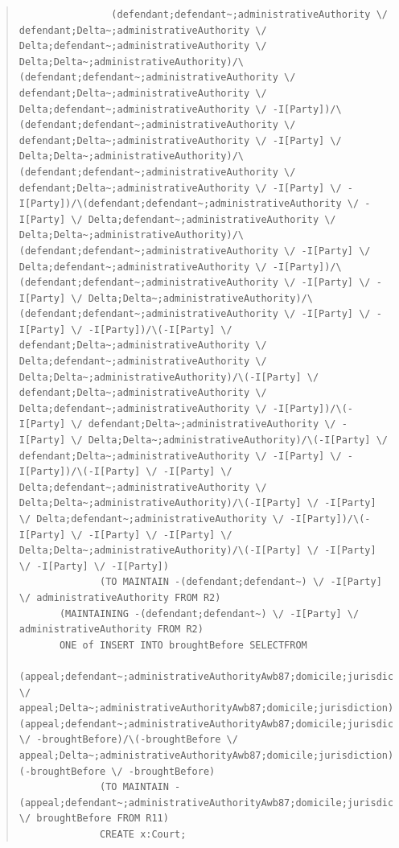 \documentclass[10pt,a4paper]{report}              %
\theoremstyle{plain}\theorembodyfont{\rmfamily}\newtheorem{definition}{Definition}[section]
\theoremstyle{plain}\theorembodyfont{\rmfamily}\newtheorem{designrule}[definition]{Requirement}
\begin{document}
\begin{quote}
\begin{verbatim}
                (defendant;defendant~;administrativeAuthority \/ defendant;Delta~;administrativeAuthority \/ Delta;defendant~;administrativeAuthority \/ Delta;Delta~;administrativeAuthority)/\(defendant;defendant~;administrativeAuthority \/ defendant;Delta~;administrativeAuthority \/ Delta;defendant~;administrativeAuthority \/ -I[Party])/\(defendant;defendant~;administrativeAuthority \/ defendant;Delta~;administrativeAuthority \/ -I[Party] \/ Delta;Delta~;administrativeAuthority)/\(defendant;defendant~;administrativeAuthority \/ defendant;Delta~;administrativeAuthority \/ -I[Party] \/ -I[Party])/\(defendant;defendant~;administrativeAuthority \/ -I[Party] \/ Delta;defendant~;administrativeAuthority \/ Delta;Delta~;administrativeAuthority)/\(defendant;defendant~;administrativeAuthority \/ -I[Party] \/ Delta;defendant~;administrativeAuthority \/ -I[Party])/\(defendant;defendant~;administrativeAuthority \/ -I[Party] \/ -I[Party] \/ Delta;Delta~;administrativeAuthority)/\(defendant;defendant~;administrativeAuthority \/ -I[Party] \/ -I[Party] \/ -I[Party])/\(-I[Party] \/ defendant;Delta~;administrativeAuthority \/ Delta;defendant~;administrativeAuthority \/ Delta;Delta~;administrativeAuthority)/\(-I[Party] \/ defendant;Delta~;administrativeAuthority \/ Delta;defendant~;administrativeAuthority \/ -I[Party])/\(-I[Party] \/ defendant;Delta~;administrativeAuthority \/ -I[Party] \/ Delta;Delta~;administrativeAuthority)/\(-I[Party] \/ defendant;Delta~;administrativeAuthority \/ -I[Party] \/ -I[Party])/\(-I[Party] \/ -I[Party] \/ Delta;defendant~;administrativeAuthority \/ Delta;Delta~;administrativeAuthority)/\(-I[Party] \/ -I[Party] \/ Delta;defendant~;administrativeAuthority \/ -I[Party])/\(-I[Party] \/ -I[Party] \/ -I[Party] \/ Delta;Delta~;administrativeAuthority)/\(-I[Party] \/ -I[Party] \/ -I[Party] \/ -I[Party])
              (TO MAINTAIN -(defendant;defendant~) \/ -I[Party] \/ administrativeAuthority FROM R2)
       (MAINTAINING -(defendant;defendant~) \/ -I[Party] \/ administrativeAuthority FROM R2)
       ONE of INSERT INTO broughtBefore SELECTFROM
                (appeal;defendant~;administrativeAuthorityAwb87;domicile;jurisdiction \/ appeal;Delta~;administrativeAuthorityAwb87;domicile;jurisdiction)/\(appeal;defendant~;administrativeAuthorityAwb87;domicile;jurisdiction \/ -broughtBefore)/\(-broughtBefore \/ appeal;Delta~;administrativeAuthorityAwb87;domicile;jurisdiction)/\(-broughtBefore \/ -broughtBefore)
              (TO MAINTAIN -(appeal;defendant~;administrativeAuthorityAwb87;domicile;jurisdiction) \/ broughtBefore FROM R11)
              CREATE x:Court;

\end{verbatim}
\end{quote}
\end{document}
